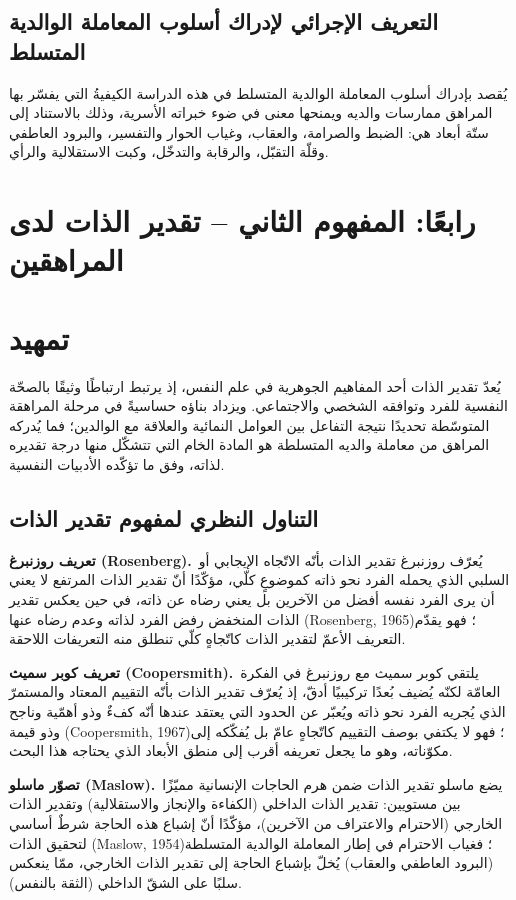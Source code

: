\documentclass[12pt,oneside]{report}
\newcommand{\en}[1]{\textenglish{#1}}
\begin{document}
\subsection{التعريف الإجرائي لإدراك أسلوب المعاملة الوالدية المتسلط}
يُقصد بإدراك أسلوب المعاملة الوالدية المتسلط في هذه الدراسة الكيفيةُ التي يفسّر بها المراهق ممارسات
والديه ويمنحها معنى في ضوء خبراته الأسرية، وذلك بالاستناد إلى ستّة أبعاد هي: الضبط والصرامة،
والعقاب، وغياب الحوار والتفسير، والبرود العاطفي وقلّة التقبّل، والرقابة والتدخّل، وكبت الاستقلالية
والرأي.

\section{رابعًا: المفهوم الثاني -- تقدير الذات لدى المراهقين}
\section*{تمهيد}
يُعدّ تقدير الذات أحد المفاهيم الجوهرية في علم النفس، إذ يرتبط ارتباطًا وثيقًا بالصحّة النفسية للفرد
وتوافقه الشخصي والاجتماعي. ويزداد بناؤه حساسيةً في مرحلة المراهقة المتوسّطة تحديدًا نتيجة التفاعل بين
العوامل النمائية والعلاقة مع الوالدين؛ فما يُدركه المراهق من معاملة والديه المتسلطة هو المادة الخام التي
تتشكّل منها درجة تقديره لذاته، وفق ما تؤكّده الأدبيات النفسية.

\subsection{التناول النظري لمفهوم تقدير الذات}
\noindent\textbf{تعريف روزنبرغ (Rosenberg).}\ يُعرّف روزنبرغ تقدير الذات بأنّه الاتّجاه الإيجابي أو
السلبي الذي يحمله الفرد نحو ذاته كموضوعٍ كلّي، مؤكّدًا أنّ تقدير الذات المرتفع لا يعني أن يرى الفرد
نفسه أفضل من الآخرين بل يعني رضاه عن ذاته، في حين يعكس تقدير الذات المنخفض رفض الفرد لذاته
وعدم رضاه عنها \en{(Rosenberg, 1965)}؛ فهو يقدّم التعريف الأعمّ لتقدير الذات كاتّجاهٍ كلّي تنطلق منه
التعريفات اللاحقة.

\noindent\textbf{تعريف كوبر سميث (Coopersmith).}\ يلتقي كوبر سميث مع روزنبرغ في الفكرة العامّة
لكنّه يُضيف بُعدًا تركيبيًا أدقّ، إذ يُعرّف تقدير الذات بأنّه التقييم المعتاد والمستمرّ الذي يُجريه الفرد نحو
ذاته ويُعبّر عن الحدود التي يعتقد عندها أنّه كفءٌ وذو أهمّية وناجح وذو قيمة \en{(Coopersmith, 1967)}؛
فهو لا يكتفي بوصف التقييم كاتّجاهٍ عامّ بل يُفكّكه إلى مكوّناته، وهو ما يجعل تعريفه أقرب إلى منطق
الأبعاد الذي يحتاجه هذا البحث.

\noindent\textbf{تصوّر ماسلو (Maslow).}\ يضع ماسلو تقدير الذات ضمن هرم الحاجات الإنسانية مميّزًا
بين مستويين: تقدير الذات الداخلي (الكفاءة والإنجاز والاستقلالية) وتقدير الذات الخارجي (الاحترام
والاعتراف من الآخرين)، مؤكّدًا أنّ إشباع هذه الحاجة شرطٌ أساسي لتحقيق الذات \en{(Maslow, 1954)}؛
فغياب الاحترام في إطار المعاملة الوالدية المتسلطة (البرود العاطفي والعقاب) يُخلّ بإشباع الحاجة إلى
تقدير الذات الخارجي، ممّا ينعكس سلبًا على الشقّ الداخلي (الثقة بالنفس).
\end{document}
